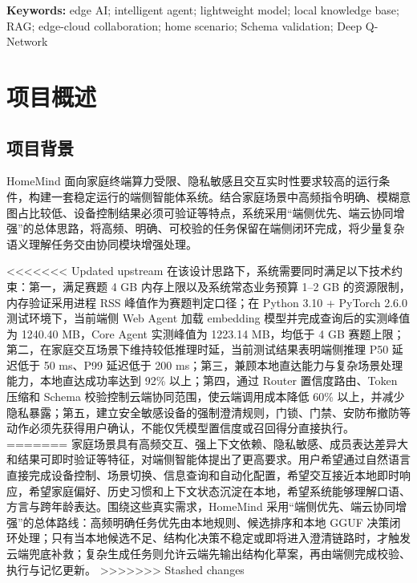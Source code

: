 \documentclass[12pt,a4paper,oneside]{ctexrep}
\begin{document}
\vspace{1em}
\noindent\textbf{Keywords:} edge AI; intelligent agent; lightweight model; local knowledge base; RAG; edge-cloud collaboration; home scenario; Schema validation; Deep Q-Network

\tableofcontents
\clearpage


\chapter{项目概述}

\section{项目背景}

HomeMind 面向家庭终端算力受限、隐私敏感且交互实时性要求较高的运行条件，构建一套稳定运行的端侧智能体系统。结合家庭场景中高频指令明确、模糊意图占比较低、设备控制结果必须可验证等特点，系统采用“端侧优先、端云协同增强”的总体思路，将高频、明确、可校验的任务保留在端侧闭环完成，将少量复杂语义理解任务交由协同模块增强处理。

<<<<<<< Updated upstream
在该设计思路下，系统需要同时满足以下技术约束：第一，满足赛题 4 GB 内存上限以及系统常态业务预算 1--2 GB 的资源限制，内存验证采用进程 RSS 峰值作为赛题判定口径；在 Python 3.10 + PyTorch 2.6.0 测试环境下，当前端侧 Web Agent 加载 embedding 模型并完成查询后的实测峰值为 1240.40 MB，Core Agent 实测峰值为 1223.14 MB，均低于 4 GB 赛题上限；第二，在家庭交互场景下维持较低推理时延，当前测试结果表明端侧推理 P50 延迟低于 50 ms、P99 延迟低于 200 ms；第三，兼顾本地直达能力与复杂场景处理能力，本地直达成功率达到 92\% 以上；第四，通过 Router 置信度路由、Token 压缩和 Schema 校验控制云端协同范围，使云端调用成本降低 60\% 以上，并减少隐私暴露；第五，建立安全敏感设备的强制澄清规则，门锁、门禁、安防布撤防等动作必须先获得用户确认，不能仅凭模型置信度或召回得分直接执行。
=======
家庭场景具有高频交互、强上下文依赖、隐私敏感、成员表达差异大和结果可即时验证等特征，对端侧智能体提出了更高要求。用户希望通过自然语言直接完成设备控制、场景切换、信息查询和自动化配置，希望交互接近本地即时响应，希望家庭偏好、历史习惯和上下文状态沉淀在本地，希望系统能够理解口语、方言与跨年龄表达。围绕这些真实需求，HomeMind 采用“端侧优先、端云协同增强”的总体路线：高频明确任务优先由本地规则、候选排序和本地 GGUF 决策闭环处理；只有当本地候选不足、结构化决策不稳定或即将进入澄清链路时，才触发云端兜底补救；复杂生成任务则允许云端先输出结构化草案，再由端侧完成校验、执行与记忆更新。
>>>>>>> Stashed changes
\end{document}
